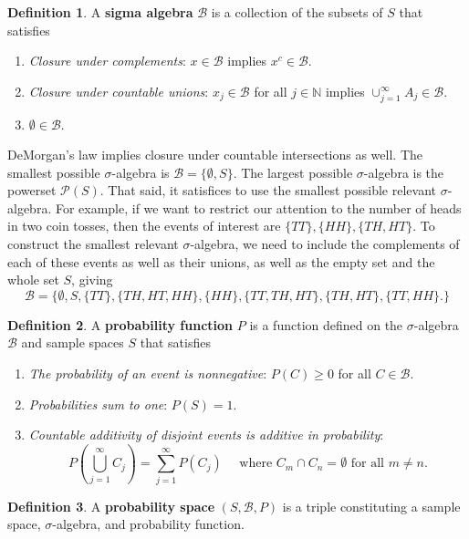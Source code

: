 \documentclass[12pt]{article}
\newcommand{\B}{\mathcal{B}}
\newcommand{\N}{\mathbb{N}}
\theoremstyle{definition}
\newtheorem{definition}{Definition}
\begin{document}
\begin{definition}
	A \textbf{sigma algebra} $\mathcal{B}$ is a collection of the subsets of $S$ that satisfies
	\begin{enumerate}
		\item \emph{Closure under complements}: $x \in \mathcal{B}$ implies  $x^c \in \mathcal{B}$.
		\item \emph{Closure under countable unions}: $x_j \in \B$ for all $j \in \N$ implies $\cup_{j=1}^{\infty} A_j \in \B$.
		\item $\emptyset \in \B$.
	\end{enumerate}
\end{definition}
DeMorgan's law implies closure under countable intersections as well. The smallest possible $\sigma$-algebra is $\B=\{\emptyset, S\}$. The largest possible $\sigma$-algebra is the powerset $\mathcal{P}(S)$. That said, it satisfices to use the smallest possible relevant $\sigma$-algebra. For example, if we want to restrict our attention to the number of heads in two coin tosses, then the events of interest are $\{TT\}, \{HH\}, \{TH, HT\}$. To construct the smallest relevant $\sigma$-algebra, we need to include the complements of each of these events as well as their unions, as well as the empty set and the whole set $S$, giving
	\[\B = \big\{\emptyset, S, \{TT\}, \{TH, HT, HH\}, \{HH\}, \{TT, TH, HT\}, \{TH, HT\}, \{TT, HH\}. \big\}	\]
	

\begin{definition}
	A \textbf{probability function} $P$ is a function defined on the $\sigma$-algebra $\B$ and sample spaces $S$ that satisfies
	\begin{enumerate}
		\item \emph{The probability of an event is nonnegative}: $P(C) \geq 0$ for all $C \in \B$.
		\item \emph{Probabilities sum to one}: $P(S)=1$.
		\item \emph{Countable additivity of disjoint events is additive in probability}:
			\[P\left( \bigcup_{j=1}^{\infty} C_j \right)= \sum_{j=1}^{\infty} P(C_j) \quad \text{ where } C_m \cap C_n = \emptyset \text{ for all } m \neq n.	\]
	\end{enumerate}
\end{definition}

\begin{definition}
	A \textbf{probability space} $(S, \B, P)$ is a triple constituting a sample space, $\sigma$-algebra, and probability function. 
\end{definition}
\end{document}
